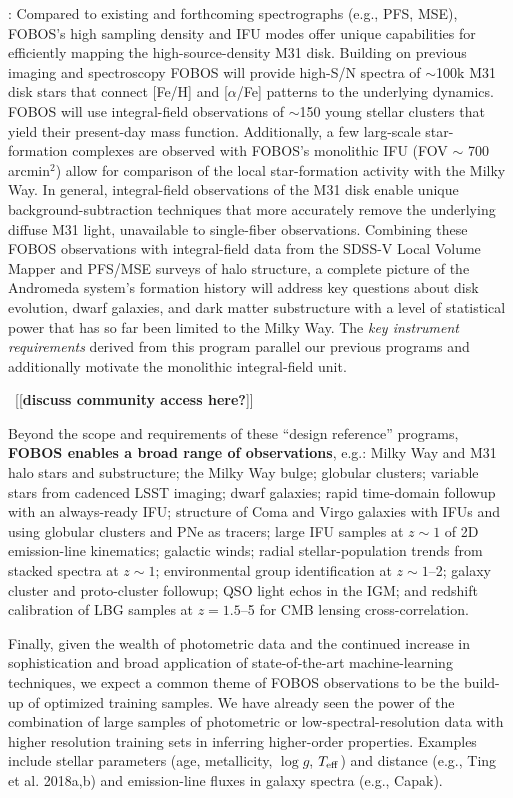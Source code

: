 \documentclass[oneside,11pt]{amsart}
\newcommand{\comment}[2][todo]{{\color{#1}[[{\bf #2}]]}}
\begin{document}
: Compared to
existing and forthcoming spectrographs (e.g., PFS, MSE), FOBOS's high
sampling density and IFU modes offer unique capabilities for
efficiently mapping the high-source-density M31 disk. Building on
previous imaging \citep[PHAT][]{phat} and spectroscopy \citep[SPLASH][]{splash} FOBOS will provide high-S/N spectra of $\sim$100k M31
disk stars that connect [Fe/H] and [$\alpha$/Fe] patterns to the
underlying dynamics. FOBOS will use integral-field observations of
$\sim$150 young stellar clusters that yield their present-day mass
function. Additionally, a few larg-scale star-formation complexes are
observed with FOBOS's monolithic IFU (FOV $\sim$ 700 arcmin$^2$)
allow for comparison of the local star-formation activity with the
Milky Way. In general, integral-field observations of the M31 disk
enable unique background-subtraction techniques that more accurately
remove the underlying diffuse M31 light, unavailable to single-fiber
observations. Combining these FOBOS observations with integral-field
data from the SDSS-V Local Volume Mapper and PFS/MSE surveys of halo
structure, a complete picture of the Andromeda system's formation
history will address key questions about disk evolution, dwarf
galaxies, and dark matter substructure with a level of statistical
power that has so far been limited to the Milky Way. The {\it key
instrument requirements} derived from this program parallel our
previous programs and additionally motivate the monolithic
integral-field unit.

~\comment{discuss community access here?}

Beyond the scope and requirements of these ``design reference''
programs, {\bf FOBOS enables a broad range of observations}, e.g.:
Milky Way and M31 halo stars and substructure; the Milky Way bulge;
globular clusters; variable stars from cadenced LSST imaging; dwarf
galaxies; rapid time-domain followup with an always-ready IFU;
structure of Coma and Virgo galaxies with IFUs and using globular
clusters and PNe as tracers; large IFU samples at $z \sim 1$ of 2D
emission-line kinematics; galactic winds; radial stellar-population
trends from stacked spectra at $z \sim 1$; environmental group
identification at $z \sim 1$--2; galaxy cluster and proto-cluster
followup; QSO light echos in the IGM; and redshift calibration of LBG
samples at $z = 1.5$--5 for CMB lensing cross-correlation.

Finally, given the wealth of photometric data and the continued
increase in sophistication and broad application of state-of-the-art
machine-learning techniques, we expect a common theme of FOBOS
observations to be the build-up of optimized training samples. We
have already seen the power of the combination of large samples of
photometric or low-spectral-resolution data with higher resolution
training sets in inferring higher-order properties. Examples include
stellar parameters (age, metallicity, $\log g$, $T_{\rm eff}$) and
distance (e.g., Ting et al. 2018a,b) and emission-line fluxes in
galaxy spectra (e.g., Capak).
\end{document}
